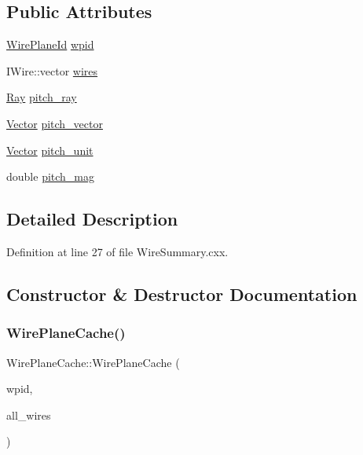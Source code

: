 \subsection*{Public Attributes}
\begin{DoxyCompactItemize}
\item 
\hyperlink{class_wire_cell_1_1_wire_plane_id}{Wire\+Plane\+Id} \hyperlink{struct_wire_plane_cache_a253233f47cbf5ece1ba3ece1a211b8c4}{wpid}
\item 
I\+Wire\+::vector \hyperlink{struct_wire_plane_cache_affdcab3668294595f76099223c013600}{wires}
\item 
\hyperlink{namespace_wire_cell_a3ab20d9b438feb7eb1ffaab9ba98af0c}{Ray} \hyperlink{struct_wire_plane_cache_a1fcdfd57ba5ad834bb7b71dd9fae6b60}{pitch\+\_\+ray}
\item 
\hyperlink{namespace_wire_cell_aa3c82d3ba85f032b0d278b7004846800}{Vector} \hyperlink{struct_wire_plane_cache_af3323239ead8e9019b19e256010fd5cb}{pitch\+\_\+vector}
\item 
\hyperlink{namespace_wire_cell_aa3c82d3ba85f032b0d278b7004846800}{Vector} \hyperlink{struct_wire_plane_cache_ab5d3c487f11c3ab90849c5f466c7e2d1}{pitch\+\_\+unit}
\item 
double \hyperlink{struct_wire_plane_cache_a41ef8c962616e240a84f5a06e6277d2c}{pitch\+\_\+mag}
\end{DoxyCompactItemize}


\subsection{Detailed Description}


Definition at line 27 of file Wire\+Summary.\+cxx.



\subsection{Constructor \& Destructor Documentation}
\mbox{\label{struct_wire_plane_cache_a2cefdea150e8bbd0eb82a2efdca9bbf4}} 
\subsubsection{\texorpdfstring{Wire\+Plane\+Cache()}{WirePlaneCache()}}
{\footnotesize\ttfamily Wire\+Plane\+Cache\+::\+Wire\+Plane\+Cache (\begin{DoxyParamCaption}\item[{\hyperlink{class_wire_cell_1_1_wire_plane_id}{Wire\+Plane\+Id}}]{wpid,  }\item[{const I\+Wire\+::vector \&}]{all\+\_\+wires }\end{DoxyParamCaption})\hspace{0.3cm}{\ttfamily [inline]}}



